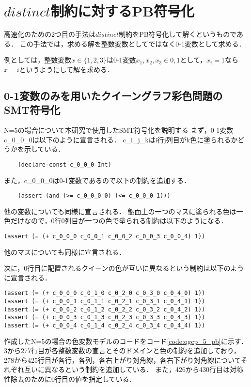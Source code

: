 %
%
\section{$distinct$制約に対するPB符号化} \label{sec:pb}
高速化のための2つ目の手法は$distinct$制約をPB符号化して解くというものである．
この手法では，求める解を整数変数としてではなく0-1変数として求める．

例としては，整数変数$x \in \{1,2,3\}$は0-1変数$x_1,x_2,x_3 \in {0,1}$として，$x_i=1$なら$x=i$というようにして解を求める．

\subsection{0-1変数のみを用いたクイーングラフ彩色問題のSMT符号化} \label{sec:pb4smt}
N=5の場合について本研究で使用したSMT符号化を説明する
まず，0-1変数c\_0\_0\_0は以下のように宣言される．
c\_i\_j\_kはi行j列目がk色に塗られるかどうかを示している．
\begin{verbatim}
    (declare-const c_0_0_0 Int)
\end{verbatim}
また，c\_0\_0\_0は0-1変数であるので以下の制約を追加する．
\begin{verbatim}
    (assert (and (>= c_0_0_0 0) (<= c_0_0_0 1)))
\end{verbatim}
他の変数についても同様に宣言される．
盤面上の一つのマスに塗られる色は一色だけなので，0行0列目が一つの色で塗られる制約は以下のようになる．
\begin{verbatim}
(assert (= (+ c_0_0_0 c_0_0_1 c_0_0_2 c_0_0_3 c_0_0_4) 1))
\end{verbatim}
他のマスについても同様に宣言される．

次に，0行目に配置されるクイーンの色が互いに異なるという制約は以下のように宣言される．
\begin{verbatim}
(assert (= (+ c_0_0_0 c_0_1_0 c_0_2_0 c_0_3_0 c_0_4_0) 1))
(assert (= (+ c_0_0_1 c_0_1_1 c_0_2_1 c_0_3_1 c_0_4_1) 1))
(assert (= (+ c_0_0_2 c_0_1_2 c_0_2_2 c_0_3_2 c_0_4_2) 1))
(assert (= (+ c_0_0_3 c_0_1_3 c_0_2_3 c_0_3_3 c_0_4_3) 1))
(assert (= (+ c_0_0_4 c_0_1_4 c_0_2_4 c_0_3_4 c_0_4_4) 1))
\end{verbatim}

作成したN=5の場合の色変数モデルのコードをコード\ref{code:qgcp_5_pb}に示す．
3から277行目が各整数変数の宣言とそのドメインと色の制約を追加しており，
278から425行目が各行，各列，各右上がり対角線，各右下がり対角線についてそれぞれ互いに異なるという制約を追加している．
また，426から430行目は対称性除去のために0行目の値を指定している．

